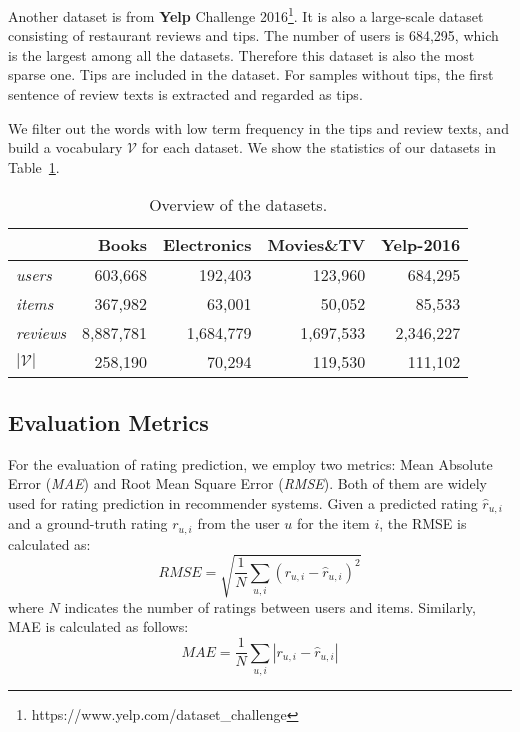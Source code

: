 \documentclass[sigconf]{acmart}
\begin{document}
Another dataset is from \textbf{Yelp} Challenge 2016\footnote{https://www.yelp.com/dataset\_challenge}.
It is also a large-scale dataset consisting of restaurant reviews and tips.
The number of users is 684,295, which is the largest among all the datasets. Therefore this dataset is also the most sparse one. Tips are included in the dataset. For samples without tips, the first sentence of review texts is extracted and regarded as tips.

We filter out the words with low term frequency in the tips and review texts, and build a vocabulary $\mathcal{V}$ for each dataset. We show the statistics of our datasets in Table~\ref{tbl:rec_dataset}.

\begin{table}[!t]
	\centering
	\caption[datasets]{Overview of the datasets.}
	\label{tbl:rec_dataset}
	\begin{tabular}{lrrrr}
		\toprule
		& \textbf{Books} & \textbf{Electronics} &\textbf{ Movies\&TV} & \textbf{Yelp-2016}  \\
		\midrule
		\textit{users}     & 603,668  & 192,403 & 123,960  & 684,295 \\
		\textit{items} & 367,982  & 63,001  & 50,052  & 85,533 \\
		\textit{reviews}   & 8,887,781  & 1,684,779 & 1,697,533   & 2,346,227\\
		$|\mathcal{V}|$   &  258,190 &  70,294 & 119,530   &  111,102 \\
		\bottomrule
	\end{tabular}
	\vspace{0mm}
\end{table}



\subsection{Evaluation Metrics}
For the evaluation of rating prediction,
we employ two metrics: Mean Absolute Error (\textit{MAE}) and Root
Mean Square Error (\textit{RMSE}).
Both of them are widely used for rating prediction in recommender systems. Given a predicted rating $\hat r_{u,i}$ and a ground-truth rating $r_{u,i}$ from the user $u$ for the item $i$, the RMSE is calculated as:
%
\begin{equation}\label{eq:expst1}
RMSE = \sqrt {\frac{1}{N}\sum\limits_{u,i} {{{({r_{u,i}} - \hat r_{u,i})}^2}} }
\end{equation}
%
where $N$ indicates the number of ratings between users and items. Similarly, MAE is calculated as follows:
%
\begin{equation}\label{eq:expst2}
MAE = \frac{1}{N}\sum\limits_{u,i} {\left| {{r_{u,i}} - \hat r_{u,i}} \right|}
\end{equation}
\end{document}
